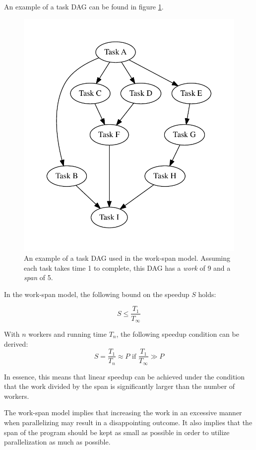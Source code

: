 An example of a task DAG can be found in figure \ref{fig:dag_example}.

\begin{figure}[ht]
  \centering
  \includegraphics[width=120mm]{figures/task_dag_example.pdf}
  \caption[Example of work-span model task DAG]{An example of a task DAG used in the work-span model. Assuming each task takes
    time 1 to complete, this DAG has a \textit{work} of 9 and a \textit{span} of 5.}
  \label{fig:dag_example}
\end{figure}

In the work-span model, the following bound on the speedup $S$ holds:

\begin{displaymath}
  S \leq \frac{T_1}{T_\infty}
\end{displaymath}

With $n$ workers and running time $T_n$, the following speedup condition can be derived:
\begin{displaymath}
  S = \frac{T_1}{T_n} \approx P \text{ if } \frac{T_1}{T_\infty} \gg P
\end{displaymath}

In essence, this means that linear speedup can be achieved under the condition that the work divided by the span is significantly
larger than the number of workers.

The work-span model implies that increasing the work in an excessive manner when parallelizing may result in a disappointing
outcome. It also implies that the span of the program should be kept as small as possible in order to utilize parallelization as
much as possible.
